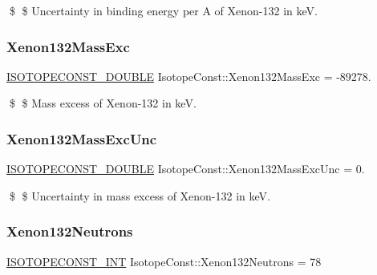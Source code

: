 \$ \$ Uncertainty in binding energy per A of Xenon-\/132 in keV. \mbox{\label{group___isotope_const-_xenon-_xe132_ga9f69241bb331e556526d9306177dd03b}} 
\subsubsection{\texorpdfstring{Xenon132\+Mass\+Exc}{Xenon132MassExc}}
{\footnotesize\ttfamily \mbox{\hyperlink{group___isotope_const-_macros_ga8f45a7272ce02c0b4c65c44636ed719a}{I\+S\+O\+T\+O\+P\+E\+C\+O\+N\+S\+T\+\_\+\+D\+O\+U\+B\+LE}} Isotope\+Const\+::\+Xenon132\+Mass\+Exc = -\/89278.}

\$ \$ Mass excess of Xenon-\/132 in keV. \mbox{\label{group___isotope_const-_xenon-_xe132_ga4a940fc7fe41e1288afce93fbcd7acb8}} 
\subsubsection{\texorpdfstring{Xenon132\+Mass\+Exc\+Unc}{Xenon132MassExcUnc}}
{\footnotesize\ttfamily \mbox{\hyperlink{group___isotope_const-_macros_ga8f45a7272ce02c0b4c65c44636ed719a}{I\+S\+O\+T\+O\+P\+E\+C\+O\+N\+S\+T\+\_\+\+D\+O\+U\+B\+LE}} Isotope\+Const\+::\+Xenon132\+Mass\+Exc\+Unc = 0.}

\$ \$ Uncertainty in mass excess of Xenon-\/132 in keV. \mbox{\label{group___isotope_const-_xenon-_xe132_ga6e8a521724e3b5c30de76ddcf53f1af3}} 
\subsubsection{\texorpdfstring{Xenon132\+Neutrons}{Xenon132Neutrons}}
{\footnotesize\ttfamily \mbox{\hyperlink{group___isotope_const-_macros_ga5f18360b3e99483a35c32d789e62621c}{I\+S\+O\+T\+O\+P\+E\+C\+O\+N\+S\+T\+\_\+\+I\+NT}} Isotope\+Const\+::\+Xenon132\+Neutrons = 78}

